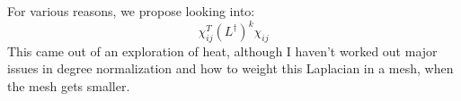 For various reasons, we propose looking into:
\[ \chi_{ij}^T \left(L^{\dag}\right)^k \chi_{ij} \]
This came out of an exploration of heat, although I haven't
worked out major issues in degree normalization and how to weight
this Laplacian in a mesh, when the mesh gets smaller.

